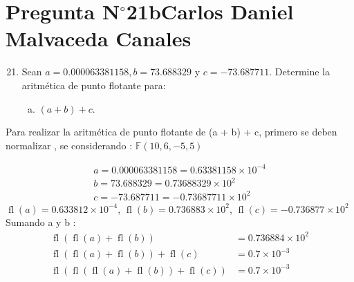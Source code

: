 \section{Pregunta N$^{\circ}$21b\qquad Carlos Daniel Malvaceda Canales}

\begin{frame}
	\begin{enumerate}\setcounter{enumi}{20}
		\item

		      Sean $a=0.000063381158, b=73.688329$ y $c=-73.687711$.
		      Determine la aritmética de punto flotante para:

		      \begin{enumerate}[b)]
			      \item

			            \begin{math}
				            \left(a+b\right)+c
			            \end{math}.
		      \end{enumerate}
	\end{enumerate}

    \begin{solution}
        Para realizar la aritmética de punto flotante de (a + b) + c, primero se deben normalizar , se considerando : 
        \begin{math}
            \mathbb{F}\left(10,6,-5,5\right)
        \end{math}
        
        \begin{align*}
            a = 0.000063381158 = 0.63381158 \times 10^{-4} \\
            b = 73.688329 = 0.73688329 \times 10^{2} \\
            c = -73.687711 = -0.73687711 \times 10^{2} 
        \end{align*}
        \begin{math}
			\operatorname{fl}\left(a\right)=
			0.633812\times 10^{-4}
		\end{math},
		\begin{math}
			\operatorname{fl}\left(b\right)=
			0.736883\times 10^{2}
		\end{math},
		\begin{math}
			\operatorname{fl}\left(c\right)=
			-0.736877\times 10^{2}
		\end{math}
        \\Sumando a y b :
        \begin{align*}
			\operatorname{fl}\left(\operatorname{fl}\left(a\right)+\operatorname{fl}\left(b\right)\right)
			 & =
			0.736884\times 10^{2} \\
			\operatorname{fl}\left(\operatorname{fl}\left(a\right)+\operatorname{fl}\left(b\right)\right)+
			\operatorname{fl}\left(c\right)
			 & =0.7\times 10^{-3} \\
			\operatorname{fl}\left(\operatorname{fl}\left(\operatorname{fl}\left(a\right)+\operatorname{fl}\left(b\right)\right)+
			\operatorname{fl}\left(c\right)\right)
			 & =
			0.7\times 10^{-3}
		\end{align*}
        
    \end{solution}
        

\end{frame}
